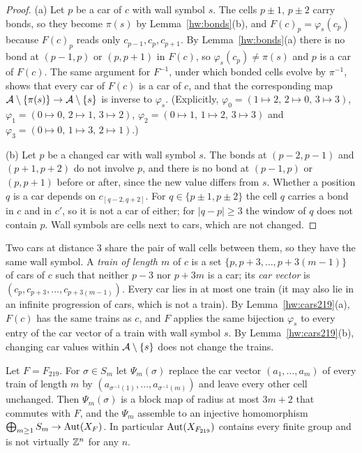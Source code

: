\begin{proof}
(a) Let $p$ be a car of $c$ with wall symbol $s$. The cells $p\pm1$, $p\pm2$ carry bonds, so they become $\pi(s)$ by Lemma~\ref{hw:bonds}(b), and $F(c)_p=\varphi_s(c_p)$ because $F(c)_p$ reads only $c_{p-1},c_p,c_{p+1}$. By Lemma~\ref{hw:bonds}(a) there is no bond at $(p-1,p)$ or $(p,p+1)$ in $F(c)$, so $\varphi_s(c_p)\ne\pi(s)$ and $p$ is a car of $F(c)$. The same argument for $F^{-1}$, under which bonded cells evolve by $\pi^{-1}$, shows that every car of $F(c)$ is a car of $c$, and that the corresponding map $\mathcal{A}\setminus\{\pi(s)\}\to\mathcal{A}\setminus\{s\}$ is inverse to $\varphi_s$. (Explicitly, $\varphi_0=(1\mapsto2,\,2\mapsto0,\,3\mapsto3)$, $\varphi_1=(0\mapsto0,\,2\mapsto1,\,3\mapsto2)$, $\varphi_2=(0\mapsto1,\,1\mapsto2,\,3\mapsto3)$ and $\varphi_3=(0\mapsto0,\,1\mapsto3,\,2\mapsto1)$.)

(b) Let $p$ be a changed car with wall symbol $s$. The bonds at $(p-2,p-1)$ and $(p+1,p+2)$ do not involve $p$, and there is no bond at $(p-1,p)$ or $(p,p+1)$ before or after, since the new value differs from $s$. Whether a position $q$ is a car depends on $c_{[q-2,q+2]}$. For $q\in\{p\pm1,p\pm2\}$ the cell $q$ carries a bond in $c$ and in $c'$, so it is not a car of either; for $|q-p|\ge3$ the window of $q$ does not contain $p$. Wall symbols are cells next to cars, which are not changed.
\end{proof}

Two cars at distance $3$ share the pair of wall cells between them, so they have the same wall symbol. A \emph{train of length $m$} of $c$ is a set $\{p,p+3,\dots,p+3(m-1)\}$ of cars of $c$ such that neither $p-3$ nor $p+3m$ is a car; its \emph{car vector} is $(c_p,c_{p+3},\dots,c_{p+3(m-1)})$. Every car lies in at most one train (it may also lie in an infinite progression of cars, which is not a train). By Lemma~\ref{hw:cars219}(a), $F(c)$ has the same trains as $c$, and $F$ applies the same bijection $\varphi_s$ to every entry of the car vector of a train with wall symbol $s$. By Lemma~\ref{hw:cars219}(b), changing car values within $\mathcal{A}\setminus\{s\}$ does not change the trains.

\begin{theorem}\label{hw:219}
Let $F=F_{219}$. For $\sigma\in S_m$ let $\Psi_m(\sigma)$ replace the car vector $(a_1,\dots,a_m)$ of every train of length $m$ by $(a_{\sigma^{-1}(1)},\dots,a_{\sigma^{-1}(m)})$ and leave every other cell unchanged. Then $\Psi_m(\sigma)$ is a block map of radius at most $3m+2$ that commutes with $F$, and the $\Psi_m$ assemble to an injective homomorphism $\bigoplus_{m\ge1}S_m\to\operatorname{Aut}(X_F)$. In particular $\operatorname{Aut}(X_{F_{219}})$ contains every finite group and is not virtually $\mathbb{Z}^n$ for any $n$.
\end{theorem}

